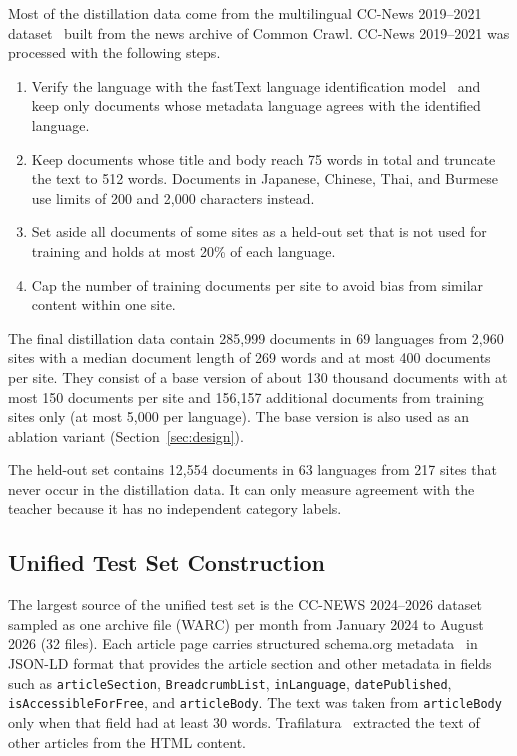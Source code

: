 \documentclass{ieeeaccess}
\begin{document}
Most of the distillation data come from the multilingual CC-News 2019--2021 dataset~\cite{cloversearch_ccnews} built from the news archive of Common Crawl. CC-News 2019--2021 was processed with the following steps.
\begin{enumerate}
  \item Verify the language with the fastText language identification model~\cite{joulin2017bag} and keep only documents whose metadata language agrees with the identified language.
  \item Keep documents whose title and body reach 75 words in total and truncate the text to 512 words. Documents in Japanese, Chinese, Thai, and Burmese use limits of 200 and 2,000 characters instead.
  \item Set aside all documents of some sites as a held-out set that is not used for training and holds at most 20\% of each language.
  \item Cap the number of training documents per site to avoid bias from similar content within one site.
\end{enumerate}
The final distillation data contain 285,999 documents in 69 languages from 2,960 sites with a median document length of 269 words and at most 400 documents per site. They consist of a base version of about 130 thousand documents with at most 150 documents per site and 156,157 additional documents from training sites only (at most 5,000 per language). The base version is also used as an ablation variant (Section~\ref{sec:design}).

The held-out set contains 12,554 documents in 63 languages from 217 sites that never occur in the distillation data. It can only measure agreement with the teacher because it has no independent category labels.

\subsection{Unified Test Set Construction}
\label{sec:testset}
The largest source of the unified test set is the CC-NEWS 2024--2026 dataset~\cite{commoncrawl2026ccnews} sampled as one archive file (WARC) per month from January 2024 to August 2026 (32 files). Each article page carries structured schema.org metadata~\cite{guha2016schema} in JSON-LD format that provides the article section and other metadata in fields such as \texttt{articleSection}, \texttt{BreadcrumbList}, \texttt{inLanguage}, \texttt{datePublished}, \texttt{isAccessibleForFree}, and \texttt{articleBody}. The text was taken from \texttt{articleBody} only when that field had at least 30 words. Trafilatura~\cite{barbaresi2021trafilatura} extracted the text of other articles from the HTML content.
\end{document}
